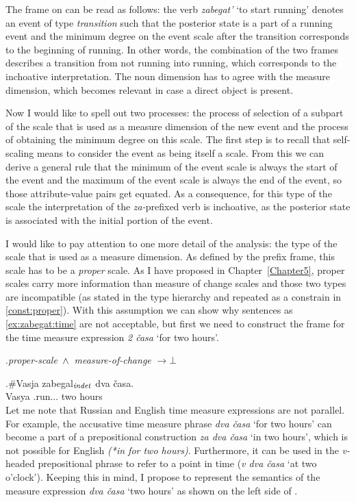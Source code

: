 The frame on  can be read as follows: the verb \textit{zabegat'} `to start running' denotes an event of type \textit{transition} such that the posterior state is a part of a running event and the minimum degree on the event scale after the transition corresponds to the beginning of running. In other words, the combination of the two frames describes a transition from not running into running, which corresponds to the inchoative interpretation. The noun dimension has to agree with the measure dimension, which becomes relevant in case a direct object is present.

Now I would like to spell out two processes: the process of selection of a subpart of the scale that is used as a measure dimension of the new event and the process of obtaining the minimum degree on this scale. The first step is to recall that self-scaling means to consider the event as being itself a scale. From this we can derive a general rule that the minimum of the event scale is always the start of the event and the maximum of the event scale is always the end of the event, so those attribute-value pairs get equated. As a consequence, for this type of the scale the interpretation of the \textit{za-}prefixed verb is inchoative, as the posterior state is associated with the initial portion of the event.

I would like to pay attention to one more detail of the analysis: the type of the scale that is used as a measure dimension. As defined by the prefix frame, this scale has to be a \textit{proper} scale. As I have proposed in Chapter~\ref{Chapter5}, proper scales carry more information than measure of change scales and those two types are incompatible (as stated in the type hierarchy and repeated as a constrain in \ref{const:proper}). With this assumption we can show why sentences as \ref{ex:zabegat:time} are not acceptable, but first we need to construct the frame for the time measure expression \textit{2 \v{c}asa} `for two hours'. 

\ex.\label{const:proper}\textit{proper-scale} $\,\wedge\,$ \textit{measure-of-change} $\rightarrow \bot$

\exg.\label{ex:zabegat:time}\#Vasja zabegal$_{\mathit{indet}}$ dva \v{c}asa.\\
Vasya .run... two hours\\

Let me note that Russian and English time measure expressions are not parallel. For example, the accusative time measure phrase \textit{dva \v{c}asa} `for two hours' can become a part of a prepositional construction \textit{za dva \v{c}asa} `in two hours', which is not possible for English \textit{(*in for two hours)}. Furthermore, it can be used in the \textit{v-}headed prepositional phrase to refer to a point in time (\textit{v dva \v{c}asa} `at two o'clock'). Keeping this in mind, I propose to represent the semantics of the measure expression \textit{dva \v{c}asa} `two hours' as shown on the left side of . 

